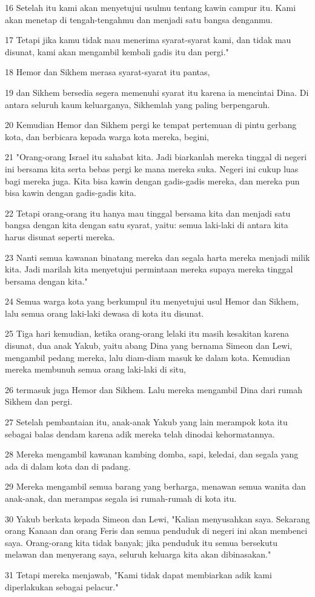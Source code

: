 \par 16 Setelah itu kami akan menyetujui usulmu tentang kawin campur itu. Kami akan menetap di tengah-tengahmu dan menjadi satu bangsa denganmu.
\par 17 Tetapi jika kamu tidak mau menerima syarat-syarat kami, dan tidak mau disunat, kami akan mengambil kembali gadis itu dan pergi."
\par 18 Hemor dan Sikhem merasa syarat-syarat itu pantas,
\par 19 dan Sikhem bersedia segera memenuhi syarat itu karena ia mencintai Dina. Di antara seluruh kaum keluarganya, Sikhemlah yang paling berpengaruh.
\par 20 Kemudian Hemor dan Sikhem pergi ke tempat pertemuan di pintu gerbang kota, dan berbicara kepada warga kota mereka, begini,
\par 21 "Orang-orang Israel itu sahabat kita. Jadi biarkanlah mereka tinggal di negeri ini bersama kita serta bebas pergi ke mana mereka suka. Negeri ini cukup luas bagi mereka juga. Kita bisa kawin dengan gadis-gadis mereka, dan mereka pun bisa kawin dengan gadis-gadis kita.
\par 22 Tetapi orang-orang itu hanya mau tinggal bersama kita dan menjadi satu bangsa dengan kita dengan satu syarat, yaitu: semua laki-laki di antara kita harus disunat seperti mereka.
\par 23 Nanti semua kawanan binatang mereka dan segala harta mereka menjadi milik kita. Jadi marilah kita menyetujui permintaan mereka supaya mereka tinggal bersama dengan kita."
\par 24 Semua warga kota yang berkumpul itu menyetujui usul Hemor dan Sikhem, lalu semua orang laki-laki dewasa di kota itu disunat.
\par 25 Tiga hari kemudian, ketika orang-orang lelaki itu masih kesakitan karena disunat, dua anak Yakub, yaitu abang Dina yang bernama Simeon dan Lewi, mengambil pedang mereka, lalu diam-diam masuk ke dalam kota. Kemudian mereka membunuh semua orang laki-laki di situ,
\par 26 termasuk juga Hemor dan Sikhem. Lalu mereka mengambil Dina dari rumah Sikhem dan pergi.
\par 27 Setelah pembantaian itu, anak-anak Yakub yang lain merampok kota itu sebagai balas dendam karena adik mereka telah dinodai kehormatannya.
\par 28 Mereka mengambil kawanan kambing domba, sapi, keledai, dan segala yang ada di dalam kota dan di padang.
\par 29 Mereka mengambil semua barang yang berharga, menawan semua wanita dan anak-anak, dan merampas segala isi rumah-rumah di kota itu.
\par 30 Yakub berkata kepada Simeon dan Lewi, "Kalian menyusahkan saya. Sekarang orang Kanaan dan orang Feris dan semua penduduk di negeri ini akan membenci saya. Orang-orang kita tidak banyak; jika penduduk itu semua bersekutu melawan dan menyerang saya, seluruh keluarga kita akan dibinasakan."
\par 31 Tetapi mereka menjawab, "Kami tidak dapat membiarkan adik kami diperlakukan sebagai pelacur."

